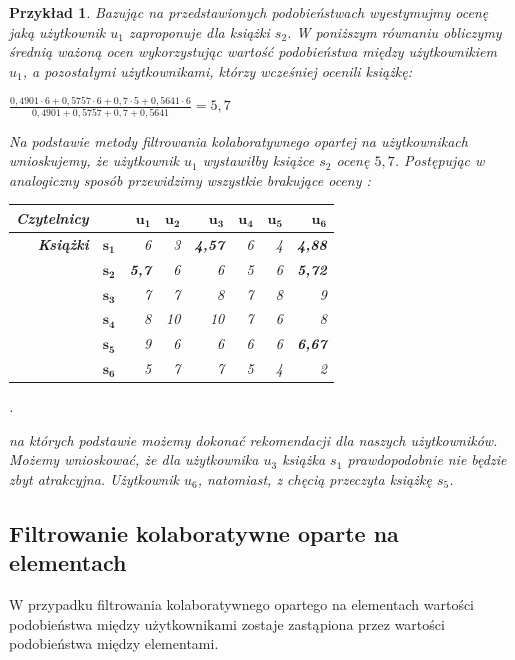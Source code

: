 \documentclass[12pt,a4paper]{report}
\newtheorem{przyklad}{Przykład}[chapter]
\begin{document}
\begin{przyklad}
Bazując na przedstawionych podobieństwach wyestymujmy ocenę jaką użytkownik $u_1$ zaproponuje dla książki $s_2$. W poniższym równaniu obliczymy średnią ważoną ocen wykorzystując wartość podobieństwa między użytkownikiem $u_1$, a pozostałymi użytkownikami, którzy wcześniej ocenili książkę:
\begin{center}
$\frac{0,4901 \cdot 6 + 0,5757 \cdot 6 + 0,7 \cdot 5 + 0,5641 \cdot 6}{0,4901 + 0,5757  + 0,7  + 0,5641} = 5,7$
\end{center}
Na podstawie metody filtrowania kolaboratywnego opartej na użytkownikach wnioskujemy, że użytkownik $u_1$ wystawiłby książce $s_2$ ocenę $5,7$.
Postępując w analogiczny sposób przewidzimy wszystkie brakujące oceny :
\begin{center}
\begin{tabular}{|r|r|r|r|r|r|r|r|} \hline
\textbf{Czytelnicy} & & $\mathbf{u_1}$ & $\mathbf{u_2}$ & $\mathbf{u_3}$ & $\mathbf{u_4}$ & $\mathbf{u_5}$ & $\mathbf{u_6}$ \\
\hline
\hline
\textbf{Książki} &$\mathbf{s_1}$ & 6 & 3 & \textbf{4,57} & 6 & 4 & \textbf{4,88} \\
\hline
&$\mathbf{s_2}$ & \textbf{5,7} & 6 & 6 & 5 & 6 & \textbf{5,72} \\
\hline
&$\mathbf{s_3}$ & 7 & 7 & 8 & 7 & 8 & 9 \\
\hline
&$\mathbf{s_4}$ & 8 & 10 & 10 & 7 & 6 & 8 \\
\hline
&$\mathbf{s_5}$ & 9 & 6 & 6 & 6 & 6 & \textbf{6,67}  \\
\hline
&$\mathbf{s_6}$ & 5 & 7 & 7 & 5 & 4 & 2 \\
\hline
\end{tabular}.
\end{center}
na których podstawie możemy dokonać rekomendacji dla naszych użytkowników.
Możemy wnioskować, że dla użytkownika $u_3$ książka $s_1$ prawdopodobnie nie będzie zbyt atrakcyjna. Użytkownik $u_6$, natomiast, z chęcią przeczyta książkę $s_5$. 
\end{przyklad}

\subsection{Filtrowanie kolaboratywne oparte na  elementach}
W przypadku filtrowania kolaboratywnego opartego na elementach wartości podobieństwa między użytkownikami zostaje zastąpiona przez  wartości podobieństwa między elementami.
\end{document}
